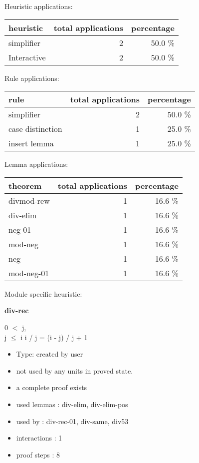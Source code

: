 \documentclass[a4paper]{article}
\begin{document}
\medskip


Heuristic applications:

\begin{supertabular}{l|r|r}
heuristic	& total applications & percentage \\ \hline
simplifier & 2 & 50.0 \% \\
Interactive & 2 & 50.0 \% \\

\end{supertabular}

Rule applications:

\begin{supertabular}{l|r|r}
rule	        & total applications & percentage \\ \hline
simplifier & 2 & 50.0 \% \\
case distinction & 1 & 25.0 \% \\
insert lemma & 1 & 25.0 \% \\

\end{supertabular}

Lemma applications:

\begin{supertabular}{l|r|r}
theorem	        & total applications & percentage \\ \hline
divmod-rew & 1 & 16.6 \% \\
div-elim & 1 & 16.6 \% \\
neg-01 & 1 & 16.6 \% \\
mod-neg & 1 & 16.6 \% \\
neg & 1 & 16.6 \% \\
mod-neg-01 & 1 & 16.6 \% \\

\end{supertabular}

Module specific heuristic:

\pagebreak

{\LARGE\bf div-rec}\label{lemma-div-rec}

\medskip

0 $<$ j, \\
j $\le$ i \Fol i / j = (i - j) / j + 1

\begin{itemize}

\item Type: created by user

\item not used by any units in proved state.
\item       a complete proof exists
\item       used lemmas  : div-elim, div-elim-pos
\item       used by      : div-rec-01, div-same, div53
\item       interactions : 1
\item       proof steps  : 8
\end{itemize}
\end{document}
